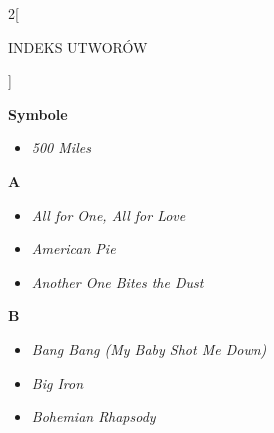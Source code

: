 \documentclass[a4paper]{report}
\begin{document}
\begin{multicols*}{2}[\begin{Huge}INDEKS UTWORÓW\end{Huge}\vspace{1cm}]\begin{minipage}{\columnwidth}
	\begin{Large}
		\textbf{Symbole}
	\end{Large} 
	\begin{itemize}[topsep=6pt, after=\vspace{5mm}, leftmargin=0mm]
		\itemsep0em
		\item[]\textit{500 Miles}  \\
	\end{itemize}
\end{minipage}
\begin{minipage}{\columnwidth}
\begin{Large}
		\textbf{A}
	\end{Large} 
	\begin{itemize}[topsep=6pt, after=\vspace{5mm}, leftmargin=0mm]
		\itemsep0em
		\item[]\textit{All for One, All for Love}  \\
		\item[]  \textit{American Pie}  \\
		\item[]  \textit{Another One Bites the Dust}  \\
	\end{itemize}
\end{minipage}
\begin{minipage}{\columnwidth}
\begin{Large}
		\textbf{B}
	\end{Large} 
	\begin{itemize}[topsep=6pt, after=\vspace{5mm}, leftmargin=0mm]
		\itemsep0em
		\item[]\textit{Bang Bang (My Baby Shot Me Down)}  \\
		\item[]  \textit{Big Iron}  \\
		\item[]  \textit{Bohemian Rhapsody}  \\
	\end{itemize}
\end{minipage}
\begin{minipage}{\columnwidth}

\end{minipage}
\end{multicols*}
\end{document}
